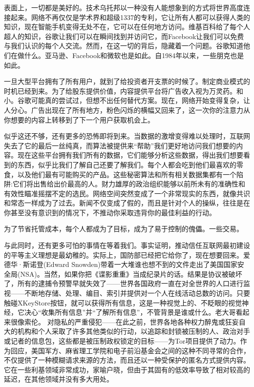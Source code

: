 表面上，一切都是美好的。技术乌托邦以一种没有人能想象到的方式将世界高度连接起来。网络不再仅仅是学术界和超级1337的专利，它让所有人都可以获得人类的知识，现在智能手机变得无处不在，它可以在任何地方访问。维基百科给了每个人超人的知识，谷歌让我们可以在瞬间找到并访问它，而Facebook让我们可以免费与我们认识的每个人交流。然而，在这一切的背后，隐藏着一个问题。谷歌知道他们在做什么。亚马逊、Facebook和微软也是如此。自1984年以来，一些朋克也是如此。

一旦大型平台拥有了所有用户，就到了给投资者开支票的时候了。制定商业模式的时机已经到来。为了给股东提供价值，内容提供平台将广告收入视为万灵药。和小。谷歌可能真的尝试过，但想不出任何替代方案。现在，网络开始变得复杂，让人分心。广告出现在了所有地方，粉色闪烁的横幅又回来了，这一次你的注意力从你想要的内容上转移到了下一个用户获取机会上。

似乎这还不够，还有更多的恐怖即将到来。当数据的激增变得难以处理时，互联网失去了它的最后一丝纯真，而算法被提供来“帮助”我们更好地访问我们想要的内容。现在这些平台拥有我们所有的数据，它们能够分析这些数据，得出我们想要看到的东西，似乎比我们了解自己还要了解我们。每个人都会吃到他们最喜欢的零食，以及他们最有可能购买的产品。这些秘密算法和所有相关数据集都有一个陷阱:它们将出售给出价最高的人。财力雄厚的政治组织能够以前所未有的准确性和有效性瞄准摇摆不定的选民。网络空间突然变成了一个非常现实的东西，就像共识和常态一样成为了过去。新闻不仅变成了假的，而且是针对个人的操纵，往往是在你甚至没有意识到的情况下，不推动你采取违背你的最佳利益的行动。

为了节省托管成本，每个人都成为了目标，成为了易于控制的傀儡。一些交易。

与此同时，还有更多可怕的事情在等着我们。事实证明，推动信任互联网最初建设的平等主义理想是最幼稚的。实际上，国防部已经把它给你了，现在想要回来。爱德华·斯诺登(Edward Snowden)带着一大堆谁也想不到的文件走出了美国国家安全局(NSA)。当然，如果你把《谍影重重》当成纪录片的话。结果是协议被破坏了，所有的逮捕令预警早就失效了——世界各国政府一直在对全世界的人口进行监视——不断地存储、处理、编目、索引并提供对一个人在线活动总数的访问。只要触碰XKeyStore按钮，就可以获得所有信息，这是一种视觉上的、不眨眼的视觉神经，它决心“收集所有信息”并“了解所有信息”，不管背景是谁或什么。老大哥看起来很像索伦。
对隐私的严重侵犯——在此之前，世界各地各种权力醉鬼或狂妄自大的机构和个人采取了许多其他类似的行动，以追踪和封锁被压制的人、政治对手或记者的信息包，这些都是被压制政权锁定的目标——为Tor项目提供了动力。作为回应，美国军方、麻省理工学院和电子前沿基金会之间的这种不同寻常的合作，不仅提供了一种模糊请求来源的方法，而且还以一种受保护的匿名方式提供内容。它在一些利基领域非常成功，家喻户晓，但由于其固有的低效率导致了相对较高的延迟，在其他领域并没有多大用处。

